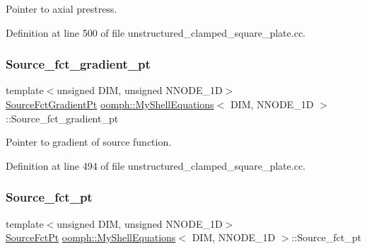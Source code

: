 Pointer to axial prestress. 



Definition at line 500 of file unstructured\+\_\+clamped\+\_\+square\+\_\+plate.\+cc.

\mbox{\label{classoomph_1_1MyShellEquations_ab45cb2cb03c75c4410fa4288f9a8be90}} 
\subsubsection{\texorpdfstring{Source\+\_\+fct\+\_\+gradient\+\_\+pt}{Source\_fct\_gradient\_pt}}
{\footnotesize\ttfamily template$<$unsigned D\+IM, unsigned N\+N\+O\+D\+E\+\_\+1D$>$ \\
\hyperlink{classoomph_1_1MyShellEquations_a954dcc1b78710f331ed390b716aa07dd}{Source\+Fct\+Gradient\+Pt} \hyperlink{classoomph_1_1MyShellEquations}{oomph\+::\+My\+Shell\+Equations}$<$ D\+IM, N\+N\+O\+D\+E\+\_\+1D $>$\+::Source\+\_\+fct\+\_\+gradient\+\_\+pt\hspace{0.3cm}{\ttfamily [protected]}}



Pointer to gradient of source function. 



Definition at line 494 of file unstructured\+\_\+clamped\+\_\+square\+\_\+plate.\+cc.

\mbox{\label{classoomph_1_1MyShellEquations_a60988a3591e836a2afecf416d1287985}} 
\subsubsection{\texorpdfstring{Source\+\_\+fct\+\_\+pt}{Source\_fct\_pt}}
{\footnotesize\ttfamily template$<$unsigned D\+IM, unsigned N\+N\+O\+D\+E\+\_\+1D$>$ \\
\hyperlink{classoomph_1_1MyShellEquations_a056d2488b6e65787f5c9935a321b7a9b}{Source\+Fct\+Pt} \hyperlink{classoomph_1_1MyShellEquations}{oomph\+::\+My\+Shell\+Equations}$<$ D\+IM, N\+N\+O\+D\+E\+\_\+1D $>$\+::Source\+\_\+fct\+\_\+pt\hspace{0.3cm}{\ttfamily [protected]}}



